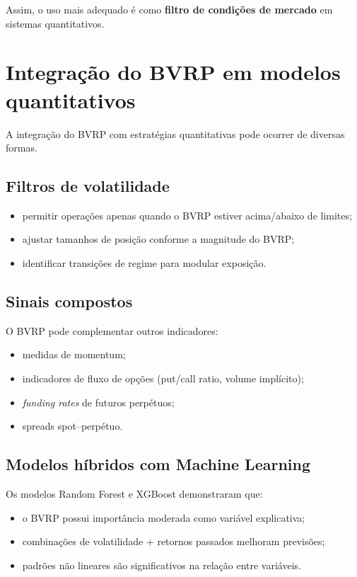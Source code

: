 Assim, o uso mais adequado é como \textbf{filtro de condições de mercado} em
sistemas quantitativos.

\section{Integração do BVRP em modelos quantitativos}

A integração do BVRP com estratégias quantitativas pode ocorrer de diversas
formas.

\subsection{Filtros de volatilidade}

\begin{itemize}
    \item permitir operações apenas quando o BVRP estiver acima/abaixo de limites;
    \item ajustar tamanhos de posição conforme a magnitude do BVRP;
    \item identificar transições de regime para modular exposição.
\end{itemize}

\subsection{Sinais compostos}

O BVRP pode complementar outros indicadores:

\begin{itemize}
    \item medidas de momentum;
    \item indicadores de fluxo de opções (put/call ratio, volume implícito);
    \item \textit{funding rates} de futuros perpétuos;
    \item spreads spot–perpétuo.
\end{itemize}

\subsection{Modelos híbridos com Machine Learning}

Os modelos Random Forest e XGBoost demonstraram que:

\begin{itemize}
    \item o BVRP possui importância moderada como variável explicativa;
    \item combinações de volatilidade + retornos passados melhoram previsões;
    \item padrões não lineares são significativos na relação entre variáveis.
\end{itemize}

